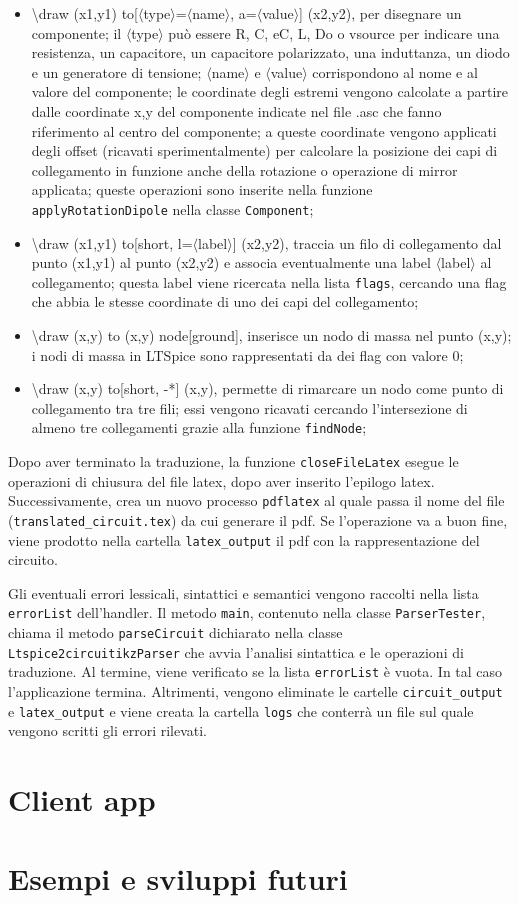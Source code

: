 \begin{itemize}
	\item \textbackslash draw (x1,y1) to[$\langle$type$\rangle$=$\langle$name$\rangle$, a=$\langle$value$\rangle$] (x2,y2), per disegnare un componente; il $\langle$type$\rangle$ può essere R, C, eC, L, Do o vsource per indicare una resistenza, un capacitore, un capacitore polarizzato, una induttanza, un diodo e un generatore di tensione; $\langle$name$\rangle$ e $\langle$value$\rangle$ corrispondono al nome e al valore del componente; le coordinate degli estremi vengono calcolate a partire dalle coordinate x,y del componente indicate nel file .asc che fanno riferimento al centro del componente; a queste coordinate vengono applicati degli offset (ricavati sperimentalmente) per calcolare la posizione dei capi di collegamento in funzione anche della rotazione o operazione di mirror applicata; queste operazioni sono inserite nella funzione \texttt{applyRotationDipole} nella classe \texttt{Component};
	\item \textbackslash draw (x1,y1) to[short, l=$\langle$label$\rangle$] (x2,y2), traccia un filo di collegamento dal punto (x1,y1) al punto (x2,y2) e associa eventualmente una label $\langle$label$\rangle$ al collegamento; questa label viene ricercata nella lista \texttt{flags}, cercando una flag che abbia le stesse coordinate di uno dei capi del collegamento;
	\item \textbackslash draw (x,y) to (x,y) node[ground]{}, inserisce un nodo di massa nel punto (x,y); i nodi di massa in LTSpice sono rappresentati da dei flag con valore 0;
	\item \textbackslash draw (x,y) to[short, -*] (x,y), permette di rimarcare un nodo come punto di collegamento tra tre fili; essi vengono ricavati cercando l'intersezione di almeno tre collegamenti grazie alla funzione \texttt{findNode};
\end{itemize}
Dopo aver terminato la traduzione, la funzione \texttt{closeFileLatex} esegue le operazioni di chiusura del file latex, dopo aver inserito l'epilogo latex. Successivamente, crea un nuovo processo \texttt{pdflatex} al quale passa il nome del file (\texttt{translated\_circuit.tex}) da cui generare il pdf. Se l'operazione va a buon fine, viene prodotto nella cartella \texttt{latex\_output} il pdf con la rappresentazione del circuito.

\noindent
Gli eventuali errori lessicali, sintattici e semantici vengono raccolti nella lista \texttt{errorList} dell'handler. Il metodo \texttt{main}, contenuto nella classe \texttt{ParserTester}, chiama il metodo \texttt{parseCircuit} dichiarato nella classe \texttt{Ltspice2circuitikzParser} che avvia l'analisi sintattica e le operazioni di traduzione. Al termine, viene verificato se la lista \texttt{errorList} è vuota. In tal caso l'applicazione termina. Altrimenti, vengono eliminate le cartelle \texttt{circuit\_output} e \texttt{latex\_output} e viene creata la cartella \texttt{logs} che conterrà un file sul quale vengono scritti gli errori rilevati.

\section{Client app}

\section{Esempi e sviluppi futuri}